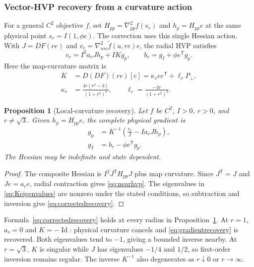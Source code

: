 \documentclass[pdflatex,sn-mathphys-num]{sn-jnl}
\newtheorem{proposition}[theorem]{Proposition}
\begin{document}
\subsubsection{Vector-HVP recovery from a curvature action}
For a general $C^2$ objective $f$, set $H_{pp}=\nabla^2_{pp}f(s_r)$ and $h_p=H_{pp}e$ at the same physical point $s_r=I(1,\phi e)$. The correction uses this single Hessian action. With $J=DF(re)$ and $v_r=\nabla^2_{ww}\widetilde f(a,re)e$, the radial HVP satisfies
\begin{equation}
 v_r=I^2a_rJ h_p+IKg_p,\qquad
 b_r=g_I+\phi e^{\mathsf T}g_p.
 \label{eq:nearhvp}
\end{equation}
Here the map-curvature matrix is
\begin{equation}
 \begin{aligned}
 K&=D(DF)(re)[e]=\kappa_r ee^{\mathsf T}+\ell_rP_\perp,\\
 \kappa_r&=\frac{4r(r^2-3)}{(1+r^2)^3},\qquad
 \ell_r=\frac{-4r}{(1+r^2)^2}.
 \end{aligned}
 \label{eq:Keigenvalues}
\end{equation}
\begin{proposition}[Local-curvature recovery]
\label{prop:localcurvature}
Let $f$ be $C^2$, $I>0$, $r>0$, and $r\ne\sqrt3$. Given $h_p=H_{pp}e$, the complete physical gradient is
\begin{equation}
 \begin{aligned}
 g_p&=K^{-1}\left(\frac{v_r}{I}-Ia_rJ h_p\right),\\
 g_I&=b_r-\phi e^{\mathsf T}g_p.
 \end{aligned}
 \label{eq:correctedrecovery}
\end{equation}
The Hessian may be indefinite and state dependent.
\end{proposition}
\begin{proof}
The composite Hessian is $I^2J^{\mathsf T}H_{pp}J$ plus map curvature. Since $J^{\mathsf T}=J$ and $Je=a_re$, radial contraction gives \eqref{eq:nearhvp}. The eigenvalues in \eqref{eq:Keigenvalues} are nonzero under the stated conditions, so subtraction and inversion give \eqref{eq:correctedrecovery}.
\end{proof}
Formula~\eqref{eq:correctedrecovery} holds at every radius in Proposition~\ref{prop:localcurvature}. At $r=1$, $a_r=0$ and $K=-\operatorname{Id}$: physical curvature cancels and \eqref{eq:gradientrecovery} is recovered. Both eigenvalues tend to $-1$, giving a bounded inverse nearby. At $r=\sqrt3$, $K$ is singular while $J$ has eigenvalues $-1/4$ and $1/2$, so first-order inversion remains regular. The inverse $K^{-1}$ also degenerates as $r\downarrow0$ or $r\to\infty$.
\end{document}

